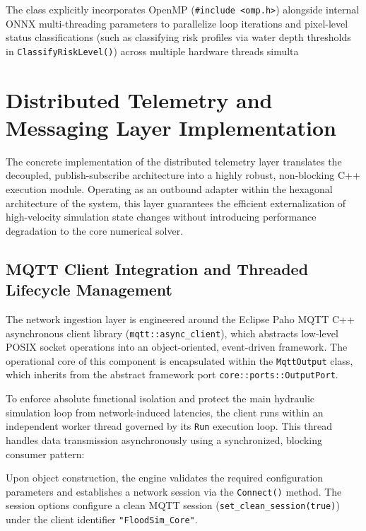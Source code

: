 The class explicitly incorporates OpenMP (\texttt{\#include <omp.h>}) alongside internal 
ONNX multi-threading parameters to parallelize loop iterations and pixel-level status classifications (such as classifying risk 
profiles via water depth thresholds in \texttt{ClassifyRiskLevel()}) across multiple hardware threads simulta





\section{Distributed Telemetry and Messaging Layer Implementation}
\label{sec:distributed_telemetry_implementation}

The concrete implementation of the distributed telemetry layer translates the decoupled, publish-subscribe architecture into a highly 
robust, non-blocking C++ execution module. Operating as an outbound adapter within the hexagonal architecture of the system, this layer 
guarantees the efficient externalization of high-velocity simulation state changes without introducing performance degradation to the core 
numerical solver.

\subsection{MQTT Client Integration and Threaded Lifecycle Management}
\label{subsec:mqtt_client_integration}

The network ingestion layer is engineered around the Eclipse Paho MQTT C++ asynchronous client library (\texttt{mqtt::async\_client}), 
which abstracts low-level POSIX socket operations into an object-oriented, event-driven framework. The operational core of this component 
is encapsulated within the \texttt{MqttOutput} class, which inherits from the abstract framework port \texttt{core::ports::OutputPort}. 

To enforce absolute functional isolation and protect the main hydraulic simulation loop from network-induced latencies, the client runs 
within an independent worker thread governed by its \texttt{Run} execution loop. This thread handles data transmission asynchronously 
using a synchronized, blocking consumer pattern:

Upon object 
construction, the engine validates the required configuration parameters and establishes a network session via the \texttt{Connect()} 
method. The session options configure a clean MQTT session (\texttt{set\_clean\_session(true)}) under the client identifier 
\texttt{"FloodSim\_Core"}. 

